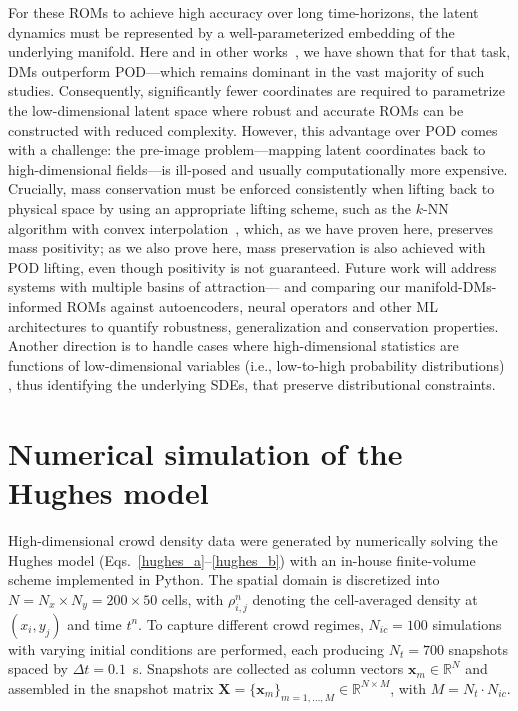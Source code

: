 \documentclass{article}
\begin{document}
For these ROMs to achieve high accuracy over long time-horizons, the latent dynamics must be represented by a well-parameterized embedding of the underlying manifold.  Here and in other works~\cite{della2024learning,della2025surrogate}, we have shown that for that task, DMs outperform POD—which remains dominant in the vast majority of such studies. Consequently, significantly fewer coordinates are required to parametrize the low-dimensional latent space where robust and accurate ROMs can be constructed with reduced complexity. However, this advantage over POD comes with a challenge: the pre-image problem—mapping latent coordinates back to high-dimensional fields—is ill-posed and usually computationally more expensive. Crucially, mass conservation must be enforced consistently when lifting back to physical space by using an appropriate lifting scheme, such as the $k$-NN algorithm with convex interpolation~\cite{chin2024enabling}, which, as we have proven here, preserves mass positivity; as we also prove here, mass preservation is also achieved with POD lifting, even though positivity is not guaranteed.
Future work will address systems with multiple basins of attraction— and comparing our manifold-DMs-informed ROMs against autoencoders, neural operators and other ML architectures to quantify robustness, generalization and conservation properties.
Another direction is to handle cases where high-dimensional statistics are functions of low-dimensional variables (i.e., low-to-high probability distributions) \cite{giovanis2025generative}, thus identifying the underlying
SDEs, that preserve distributional constraints.

\appendix
\label{sec:appendix}

\section{Numerical simulation of the Hughes model}
\label{app:numerical_scheme}

High-dimensional crowd density data were generated by numerically solving the Hughes model (Eqs.~\eqref{hughes_a}–\eqref{hughes_b}) with an in-house finite-volume scheme implemented in Python. The spatial domain is discretized into \(N = N_x \times N_y = 200 \times 50\) cells, with $\rho_{i,j}^n$ denoting the cell-averaged density at $(x_i, y_j)$ and time $t^n$. To capture different crowd regimes, $N_{ic} = 100$ simulations with varying initial conditions are performed, each producing $N_t = 700$ snapshots spaced by $\Delta t = 0.1$~s. Snapshots are collected as column vectors $\mathbf{x}_m \in \mathbb{R}^N$ and assembled in the snapshot matrix $\mathbf{X} = \{\mathbf{x}_m\}_{m=1,\dots,M} \in \mathbb{R}^{N \times M}$, with $M = N_t \cdot N_{ic}$.
\end{document}

